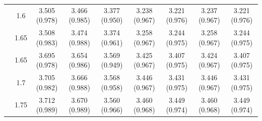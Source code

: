 \begin{tabular}{c c c c c c c c c}
 & 1.6 & 3.505 (0.978) & 3.466 (0.985) & 3.377 (0.950) & 3.238 (0.967) & 3.221 (0.976) & 3.237 (0.967) & 3.221 (0.976) \\
 & 1.65 & 3.508 (0.983) & 3.474 (0.988) & 3.374 (0.961) & 3.258 (0.967) & 3.244 (0.975) & 3.258 (0.967) & 3.244 (0.975) \\
\addlinespace
5 & 1.65 & 3.695 (0.978) & 3.654 (0.986) & 3.569 (0.949) & 3.425 (0.967) & 3.407 (0.975) & 3.424 (0.967) & 3.407 (0.975) \\
 & 1.7 & 3.705 (0.982) & 3.666 (0.988) & 3.568 (0.958) & 3.446 (0.967) & 3.431 (0.975) & 3.446 (0.967) & 3.431 (0.975) \\
 & 1.75 & 3.712 (0.989) & 3.670 (0.989) & 3.560 (0.966) & 3.460 (0.968) & 3.449 (0.974) & 3.460 (0.968) & 3.449 (0.974) \\
\bottomrule
\end{tabular}
